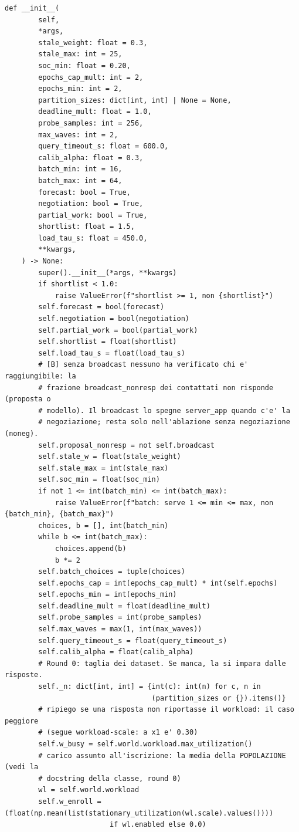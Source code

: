 \documentclass[11pt,a4paper]{article}
\begin{document}
\begin{lstlisting}[style=py,firstnumber=212,caption={\texttt{tesifl/strategies/sage\_smart.py}, lines 212--312}]
    def __init__(
        self,
        *args,
        stale_weight: float = 0.3,
        stale_max: int = 25,
        soc_min: float = 0.20,
        epochs_cap_mult: int = 2,
        epochs_min: int = 2,
        partition_sizes: dict[int, int] | None = None,
        deadline_mult: float = 1.0,
        probe_samples: int = 256,
        max_waves: int = 2,
        query_timeout_s: float = 600.0,
        calib_alpha: float = 0.3,
        batch_min: int = 16,
        batch_max: int = 64,
        forecast: bool = True,
        negotiation: bool = True,
        partial_work: bool = True,
        shortlist: float = 1.5,
        load_tau_s: float = 450.0,
        **kwargs,
    ) -> None:
        super().__init__(*args, **kwargs)
        if shortlist < 1.0:
            raise ValueError(f"shortlist >= 1, non {shortlist}")
        self.forecast = bool(forecast)
        self.negotiation = bool(negotiation)
        self.partial_work = bool(partial_work)
        self.shortlist = float(shortlist)
        self.load_tau_s = float(load_tau_s)
        # [B] senza broadcast nessuno ha verificato chi e' raggiungibile: la
        # frazione broadcast_nonresp dei contattati non risponde (proposta o
        # modello). Il broadcast lo spegne server_app quando c'e' la
        # negoziazione; resta solo nell'ablazione senza negoziazione (noneg).
        self.proposal_nonresp = not self.broadcast
        self.stale_w = float(stale_weight)
        self.stale_max = int(stale_max)
        self.soc_min = float(soc_min)
        if not 1 <= int(batch_min) <= int(batch_max):
            raise ValueError(f"batch: serve 1 <= min <= max, non {batch_min}, {batch_max}")
        choices, b = [], int(batch_min)
        while b <= int(batch_max):
            choices.append(b)
            b *= 2
        self.batch_choices = tuple(choices)
        self.epochs_cap = int(epochs_cap_mult) * int(self.epochs)
        self.epochs_min = int(epochs_min)
        self.deadline_mult = float(deadline_mult)
        self.probe_samples = int(probe_samples)
        self.max_waves = max(1, int(max_waves))
        self.query_timeout_s = float(query_timeout_s)
        self.calib_alpha = float(calib_alpha)
        # Round 0: taglia dei dataset. Se manca, la si impara dalle risposte.
        self._n: dict[int, int] = {int(c): int(n) for c, n in
                                   (partition_sizes or {}).items()}
        # ripiego se una risposta non riportasse il workload: il caso peggiore
        # (segue workload-scale: a x1 e' 0.30)
        self.w_busy = self.world.workload.max_utilization()
        # carico assunto all'iscrizione: la media della POPOLAZIONE (vedi la
        # docstring della classe, round 0)
        wl = self.world.workload
        self.w_enroll = (float(np.mean(list(stationary_utilization(wl.scale).values())))
                         if wl.enabled else 0.0)


\end{lstlisting}
\end{document}

